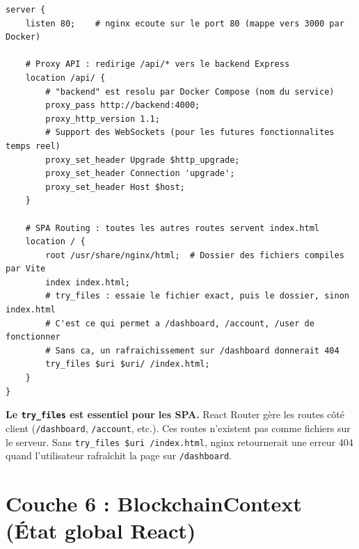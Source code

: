 \documentclass[12pt,a4paper,twoside]{report}
\begin{document}
\begin{lstlisting}[caption=nginx.conf --- proxy et SPA routing en production]
server {
    listen 80;    # nginx ecoute sur le port 80 (mappe vers 3000 par Docker)
    
    # Proxy API : redirige /api/* vers le backend Express
    location /api/ {
        # "backend" est resolu par Docker Compose (nom du service)
        proxy_pass http://backend:4000;
        proxy_http_version 1.1;
        # Support des WebSockets (pour les futures fonctionnalites temps reel)
        proxy_set_header Upgrade $http_upgrade;
        proxy_set_header Connection 'upgrade';
        proxy_set_header Host $host;
    }
    
    # SPA Routing : toutes les autres routes servent index.html
    location / {
        root /usr/share/nginx/html;  # Dossier des fichiers compiles par Vite
        index index.html;
        # try_files : essaie le fichier exact, puis le dossier, sinon index.html
        # C'est ce qui permet a /dashboard, /account, /user de fonctionner
        # Sans ca, un rafraichissement sur /dashboard donnerait 404
        try_files $uri $uri/ /index.html;
    }
}
\end{lstlisting}

\begin{warningbox}
\textbf{Le \texttt{try\_files} est essentiel pour les SPA.} React Router gère les routes côté client (\texttt{/dashboard}, \texttt{/account}, etc.). Ces routes n'existent pas comme fichiers sur le serveur. Sans \texttt{try\_files \$uri /index.html}, nginx retournerait une erreur 404 quand l'utilisateur rafraîchit la page sur \texttt{/dashboard}.
\end{warningbox}

\section{Couche 6 : BlockchainContext (État global React)}
\end{document}
